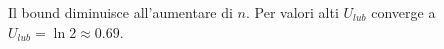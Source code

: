 \documentclass[12pt,openany,onesided]{book}
\begin{document}
\begin{table}[H]
    \centering
    \qquad
    \caption{Valori di $U_{lub}$ per RM al variare di n} 
\end{table}
\noindent
Il bound diminuisce all'aumentare di $n$. Per valori alti $U_{lub}$ converge a $U_{lub} = \ln 2 \approx 0.69$. 
\end{document}
